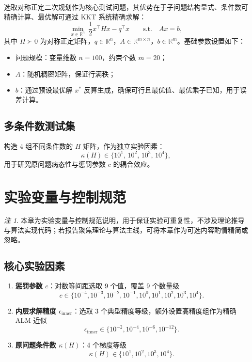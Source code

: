 \documentclass[UTF8]{ctexart}
\numberwithin{figure}{section}
\theoremstyle{definition}
\theoremstyle{examplestyle}
\theoremstyle{remark}
\newtheorem*{remark}{注}
\begin{document}
选取对称正定二次规划作为核心测试问题，其优势在于子问题结构显式、条件数可精确计算、最优解可通过 KKT 系统精确求解：
\begin{equation}
\label{eq:qp}
\min_{x\in\mathbb{R}^n}\ \frac{1}{2}x^\top H x-q^\top x \qquad \text{s.t.} \quad Ax=b,
\end{equation}
其中 $H\succ 0$ 为对称正定矩阵，$q\in\mathbb{R}^n$，$A\in\mathbb{R}^{m\times n}$，$b\in\mathbb{R}^m$。基础参数设置如下：
\begin{itemize}
\item 问题规模：变量维数 $n=100$，约束个数 $m=20$；
\item $A$：随机稠密矩阵，保证行满秩；
\item $b$：通过预设最优解 $x^*$ 反算生成，确保可行且最优值、最优乘子已知，用于误差计算。
\end{itemize}

\subsection{多条件数测试集}
\label{sec:kappa-set}

构造 4 组不同条件数的 $H$ 矩阵，作为独立实验因素：
\begin{equation}
\label{eq:kappa-grid}
\kappa(H)\in\{10^1,\,10^2,\,10^3,\,10^4\},
\end{equation}
用于研究原问题病态性与惩罚参数 $c$ 的耦合效应。


\section{实验变量与控制规范}
\label{sec:control}

\begin{remark}
本章为实验变量与控制规范说明，用于保证实验可重复性，不涉及理论推导与算法实现代码；若报告聚焦理论与算法主线，可将本章作为可选内容酌情精简或忽略。
\end{remark}

\subsection{核心实验因素}
\label{sec:factors}

\begin{enumerate}
\item \textbf{惩罚参数 $c$}：对数等间距选取 9 个值，覆盖 9 个数量级
\[
c\in\{10^{-4},10^{-3},10^{-2},10^{-1},10^{0},10^{1},10^{2},10^{3},10^{4}\}.
\]
\item \textbf{内层求解精度 $\epsilon_{\mathrm{inner}}$}：选取 3 个典型精度等级，额外设置高精度组作为精确 ALM 近似
\[
\epsilon_{\mathrm{inner}}\in\{10^{-2},10^{-4},10^{-6},10^{-12}\}.
\]
\item \textbf{原问题条件数 $\kappa(H)$}：4 个梯度等级
\[
\kappa(H)\in\{10^1,10^2,10^3,10^4\}.
\]
\end{enumerate}
\end{document}
